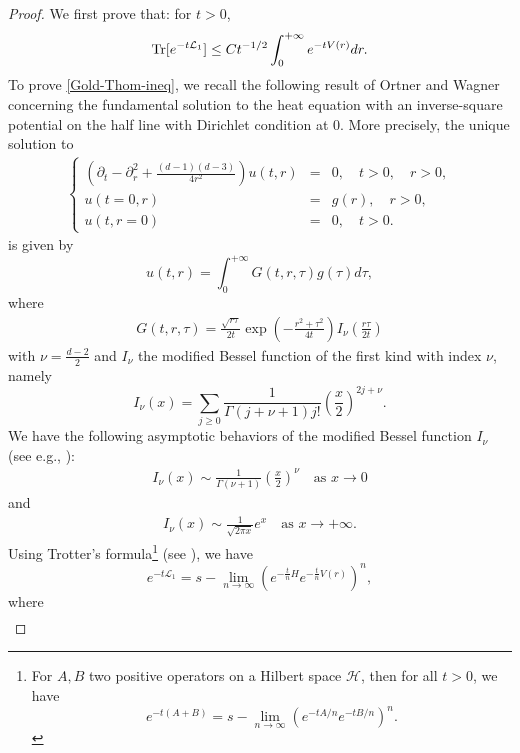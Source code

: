 \documentclass[%
11pt,  reqno]{amsart}
\theoremstyle{remarkstyle}
\newcommand{\1}{\hspace{0.2mm}\text{I}\hspace{0.2mm}}
\renewcommand{\L}{\mathcal{L}}
\numberwithin{equation}{section}
\numberwithin{theorem}{section}
\begin{document}
\begin{proof}
		 We first prove that: for $t>0$, 
		\begin{align} \label{Gold-Thom-ineq}
			{\rm Tr} [e^{-t\L_1}] \leq Ct^{-1/2} \int_0^{+\infty} e^{-tV(r)}dr.
		\end{align}
		To prove \eqref{Gold-Thom-ineq}, we recall the following result of Ortner and Wagner \cite{OW18} concerning the fundamental solution to the heat equation with an inverse-square potential on the half line with Dirichlet condition at 0. More precisely, the unique solution to
		\begin{align}\label{heat-equa}
			\left\{
			\begin{array}{rcl}
				\left(\partial_t - \partial^2_r +\frac{(d-1)(d-3)}{4r^2}\right)u(t,r) &=& 0, \quad t>0, \quad r>0, \\
				u(t=0,r) &=& g(r), \quad r>0, \\
				u(t, r=0) &=& 0, \quad t>0.
			\end{array}
			\right.
		\end{align}
		is given by
		\[
		u(t,r) = \int_0^{+\infty} G(t,r,\tau) g(\tau)d\tau,
		\]
		where
		\begin{align}\label{heat-kern}
			G(t,r,\tau) = \frac{\sqrt{r\tau}}{2t} \exp \left(-\frac{r^2+\tau^2}{4t}\right) I_\nu\left(\frac{r\tau}{2t}\right)
		\end{align}
		with $\nu =\frac{d-2}{2}$ and $I_\nu$ the modified Bessel function of the first kind with index $\nu$, namely
		\[
		I_\nu(x) = \sum_{j\geq 0} \frac{1}{\Gamma(j+\nu+1)j!}\left(\frac{x}{2}\right)^{2j+\nu}.
		\]
		We have the following asymptotic behaviors of the modified Bessel function $I_\nu$ (see e.g., \cite[Section 10.30]{NIST}):
		\begin{align} \label{I-nu-zero}
			I_\nu(x) \sim \frac{1}{\Gamma(\nu+1)}\left(\frac{x}{2}\right)^\nu \quad \text{as } x\to 0
		\end{align}
		and 
		\begin{align}\label{I-nu-infi}
			I_\nu(x) \sim \frac{1}{\sqrt{2\pi x}}e^x \quad \text{as } x\to +\infty.
		\end{align} 
		Using Trotter's formula\footnote{For $A, B$ two positive operators on a Hilbert space $\mathcal{H}$, then for all $t>0$, we have
			\[
			e^{-t(A+B)} = s-\lim_{n\to \infty} (e^{-tA/n} e^{-tB/n})^n.
			\]} (see \cite{Kato78}), we have
		\[
		e^{-t\L_1} = s-\lim_{n\to \infty} \left(e^{-\frac{t}{n}H} e^{-\frac{t}{n}V(r)}\right)^n,
		\]
		where 
		\begin{align} \label{H}

\end{align}
\end{proof}
\end{document}
